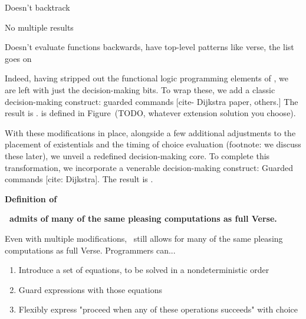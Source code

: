 \documentclass[manuscript,screen,review, 12pt, nonacm]{acmart}
\begin{document}
         Doesn't backtrack
        
         No multiple results 
        
         Doesn't evaluate functions backwards, have top-level patterns like verse, the list goes on 


        Indeed, having stripped out the functional logic programming elements of
        \VC, we are left with just the decision-making bits. To wrap these, we
        add a classic decision-making construct: guarded commands [cite-
        Dijkstra paper, others.] The result is \VMinus. \VMinus is defined in
        Figure~(TODO, whatever extension solution you choose). 

        
        With these modifications in place, alongside a few additional
        adjustments to the placement of existentials and the timing of choice
        evaluation (footnote: we discuss these later), we unveil a redefined decision-making core. To complete this
        transformation, we incorporate a venerable decision-making construct:
        Guarded commands [cite: Dijkstra]. The result is \VMinus. 

    \bf{Definition of \VMinus}

    
    \bf{\VMinus\ admits of many of the same pleasing computations as full Verse. }
    
    Even with multiple modifications, \VMinus\ still allows for many of the same
    pleasing computations as full Verse. Programmers can... 
        \begin{enumerate}
            \item Introduce a set of equations, to be solved in a nondeterministic order 
            \item Guard expressions with those equations 
            \item Flexibly express "proceed when any of these operations succeeds" with choice 
        \end{enumerate}
\end{document}
